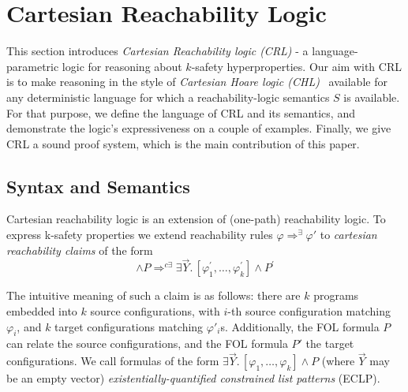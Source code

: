 \section{Cartesian Reachability Logic}
This section introduces \emph{Cartesian Reachability logic (CRL)} - a
language-parametric logic for reasoning about $k$-safety hyperproperties.  Our
aim with CRL is to make reasoning in the style of \emph{Cartesian Hoare logic
  (CHL)}~\cite{SousaD16} available for any deterministic language for which a
reachability-logic semantics $S$ is available.  For that purpose, we define the
language of CRL and its semantics, and demonstrate the logic's expressiveness
on a couple of examples.  Finally, we give CRL a sound proof system, which is the
main contribution of this paper.


\subsection{Syntax and Semantics}
\label{sec:CRLsemanticsComparisonToCHL}

Cartesian reachability logic is an extension of (one-path) reachability
logic. To express k-safety properties we extend reachability rules $\varphi
\Rightarrow^{\exists} \varphi'$ to  \emph{cartesian reachability claims} of the form
\begin{equation*}
  [\varphi_1,\ldots,\varphi_k] \land P
  \Rightarrow^{c\exists} \exists \vec{Y}.\, [\varphi^\prime_1,\ldots,\varphi^\prime_k] \land P^\prime
\end{equation*}

The intuitive meaning of such a claim is as follows: there are $k$ programs
embedded into $k$ source configurations, with $i$-th source configuration matching $\varphi_i$,
and $k$ target configurations matching $\varphi'_i$s. Additionally, the FOL
formula $P$ can relate the source configurations, and the FOL formula $P'$ the target
configurations. We call formulas of the form
$ \exists \vec{Y}.\,[\varphi_1,\ldots,\varphi_k] \land P$ (where $\vec{Y}$ may
be an empty vector) \emph{existentially-quantified constrained list patterns}
(ECLP).


